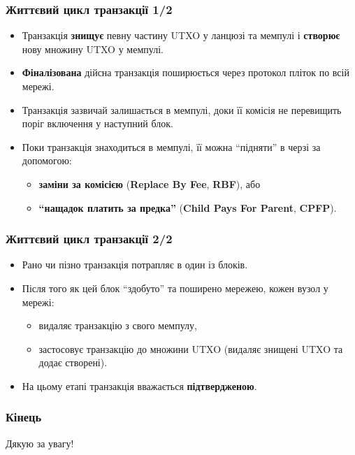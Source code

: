 \documentclass{beamer}
\begin{document}
\begin{frame}
  \frametitle{Життєвий цикл транзакції 1/2}
  \begin{itemize}
  \item Транзакція \textbf{знищує} певну частину UTXO у ланцюзі та мемпулі і
    \textbf{створює} нову множину UTXO у мемпулі.
  \item \textbf{Фіналізована} дійсна транзакція поширюється через протокол
    пліток по всій мережі.
  \item Транзакція зазвичай залишається в мемпулі, доки її комісія не перевищить
    поріг включення у наступний блок.
  \item Поки транзакція знаходиться в мемпулі, її можна ``підняти'' в черзі за
    допомогою:
    \begin{itemize}
    \item \textbf{заміни за комісією} (\textbf{Replace By Fee}, \textbf{RBF}), або
    \item \textbf{``нащадок платить за предка''} (\textbf{Child Pays For
        Parent}, \textbf{CPFP}).
    \end{itemize}
  \end{itemize}
\end{frame}

\begin{frame}
  \frametitle{Життєвий цикл транзакції 2/2}
  \begin{itemize}
  \item Рано чи пізно транзакція потрапляє в один із блоків.
  \item Після того як цей блок ``здобуто'' та поширено мережею, кожен вузол у
    мережі:
    \begin{itemize}
    \item видаляє транзакцію з свого мемпулу,
    \item застосовує транзакцію до множини UTXO (видаляє знищені UTXO та
      додає створені).
    \end{itemize}
  \item На цьому етапі транзакція вважається \textbf{підтвердженою}.
  \end{itemize}
\end{frame}

\begin{frame}
  \frametitle{Кінець}
  \begin{center}
    Дякую за увагу!
  \end{center}
\end{frame}
\end{document}
